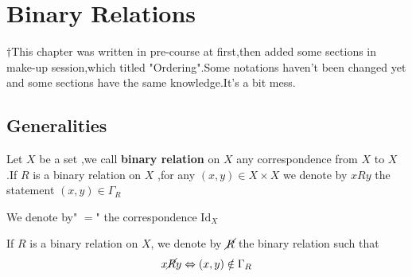 \documentclass{book}
\numberwithin{equation}{section}
\begin{document}
\chapter{Binary Relations }
$\dagger$This chapter was written in pre-course at first,then added some sections in make-up session,which titled "Ordering".Some notations haven't been changed yet and some sections have the same knowledge.It's a bit mess.
\section{Generalities}
\begin{definitionenv}
    Let $X$ be a set ,we call \textbf{binary relation} on $X$ any correspondence from $X$ to $X$ .If $R$ is a binary relation on $X$ ,for any $(x,y)\in X\times X $ we denote by $x R y $ the statement $(x,y)\in \Gamma_R$
\end{definitionenv}
\begin{exampleenv}
    We denote by" $=$" the correspondence $\mathrm{Id}_X$
\end{exampleenv}
\begin{definitionenv}
    If $R$ is a binary relation on $X$, we denote by $\cancel{R} $ the binary relation such that $$x \cancel{R}  y \Leftrightarrow (x,y)\notin \Gamma_R$$
\end{definitionenv}
\end{document}

